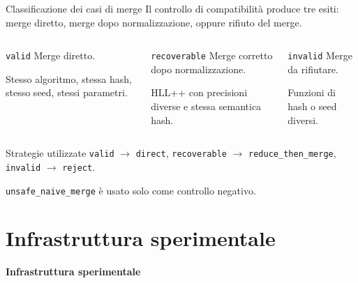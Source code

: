 \documentclass[aspectratio=169,11pt]{beamer}
\begin{document}
\begin{frame}{Classificazione dei casi di merge}
    Il controllo di compatibilit\`a produce tre esiti: merge diretto, merge dopo
    normalizzazione, oppure rifiuto del merge.


  \begin{columns}[T,onlytextwidth]
      \begin{block}{\texttt{valid}}
        \small
        Merge diretto.

        Stesso algoritmo, stessa hash, stesso seed, stessi parametri.
      \end{block}
      \begin{block}{\texttt{recoverable}}
        \small
        Merge corretto dopo normalizzazione.

        HLL++ con precisioni diverse e stessa semantica hash.
      \end{block}
      \begin{block}{\texttt{invalid}}
        \small
        Merge da rifiutare.

        Funzioni di hash o seed diversi.
      \end{block}
  \end{columns}

  \begin{block}{Strategie utilizzate}
    \small
    \texttt{valid} \(\rightarrow\) \texttt{direct},
    \qquad
    \texttt{recoverable} \(\rightarrow\) \texttt{reduce\_then\_merge},
    \qquad
    \texttt{invalid} \(\rightarrow\) \texttt{reject}.

    \texttt{unsafe\_naive\_merge} \`e usato solo come controllo negativo.
  \end{block}
\end{frame}

\section{Infrastruttura sperimentale}

\begin{frame}[plain]
  \centering
  \vfill
  {\LARGE\bfseries Infrastruttura sperimentale}
  \vfill
\end{frame}
\end{document}
